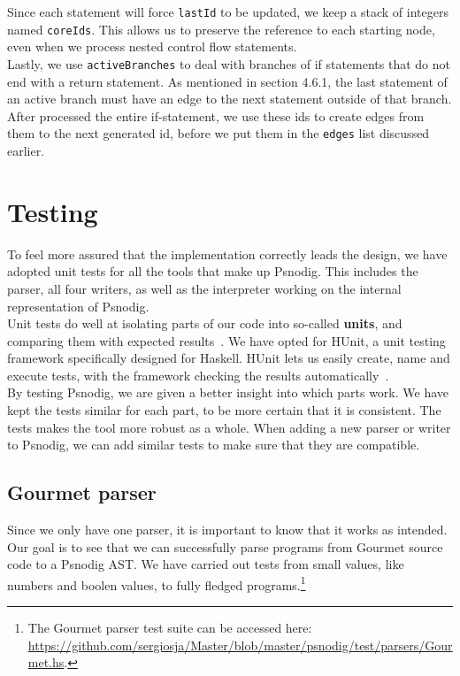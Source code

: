 Since each statement will force \texttt{lastId} to be updated, we keep a stack of integers named \texttt{coreIds}. This allows us to preserve the reference to each starting node, even when we process nested control flow statements. \\

Lastly, we use \texttt{activeBranches} to deal with branches of if statements that do not end with a return statement. As mentioned in section 4.6.1, the last statement of an active branch must have an edge to the next statement outside of that branch. After processed the entire if-statement, we use these ids to create edges from them to the next generated id, before we put them in the \texttt{edges} list discussed earlier. \\

\section{Testing}

To feel more assured that the implementation correctly leads the design, we have adopted unit tests for all the tools that make up Psnodig. This includes the parser, all four writers, as well as the interpreter working on the internal representation of Psnodig. \\

Unit tests do well at isolating parts of our code into so-called \textbf{units}, and comparing them with expected results~\cite{whatIsUnitTesting}. We have opted for HUnit, a unit testing framework specifically designed for Haskell. HUnit lets us easily create, name and execute tests, with the framework checking the results automatically~\cite{hunit}. \\

By testing Psnodig, we are given a better insight into which parts work. We have kept the tests similar for each part, to be more certain that it is consistent. The tests makes the tool more robust as a whole. When adding a new parser or writer to Psnodig, we can add similar tests to make sure that they are compatible.

\subsection{Gourmet parser}

Since we only have one parser, it is important to know that it works as intended. Our goal is to see that we can successfully parse programs from Gourmet source code to a Psnodig AST. We have carried out tests from small values, like numbers and boolen values, to fully fledged programs.\footnote{The Gourmet parser test suite can be accessed here: \url{https://github.com/sergiosja/Master/blob/master/psnodig/test/parsers/Gourmet.hs}.} \\


